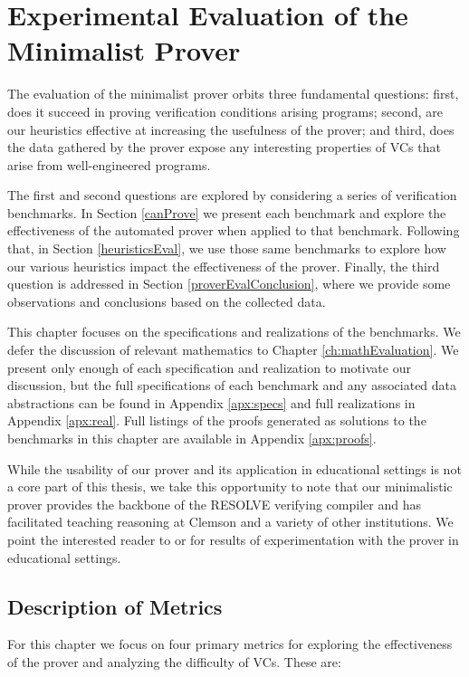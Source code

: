 


\chapter{Experimental Evaluation of the Minimalist Prover\label{ch:proverEvaluation}}
The evaluation of the minimalist prover orbits three fundamental questions: first, does it succeed in proving verification conditions arising programs; second, are our heuristics effective at increasing the usefulness of the prover; and third, does the data gathered by the prover expose any interesting properties of VCs that arise from well-engineered programs.

The first and second questions are explored by considering a series of verification benchmarks.  In Section \ref{canProve} we present each benchmark and explore the effectiveness of the automated prover when applied to that benchmark.  Following that, in Section \ref{heuristicsEval}, we use those same benchmarks to explore how our various heuristics impact the effectiveness of the prover.  Finally, the third question is addressed in Section \ref{proverEvalConclusion}, where we provide some observations and conclusions based on the collected data.

This chapter focuses on the specifications and realizations of the benchmarks.  We defer the discussion of relevant mathematics to Chapter \ref{ch:mathEvaluation}.  We present only enough of each specification and realization to motivate our discussion, but the full specifications of each benchmark and any associated data abstractions can be found in Appendix \ref{apx:specs} and full realizations in Appendix \ref{apx:real}.  Full listings of the proofs generated as solutions to the benchmarks in this chapter are available in Appendix \ref{apx:proofs}.

While the usability of our prover and its application in educational settings is not a core part of this thesis, we take this opportunity to note that our minimalistic prover provides the backbone of the RESOLVE verifying compiler and has facilitated teaching reasoning at Clemson and a variety of other institutions.  We point the interested reader to \cite{cook2012specification} or \cite{sitaraman2009engaging} for results of experimentation with the prover in educational settings.


\section{Description of Metrics}
For this chapter we focus on four primary metrics for exploring the effectiveness of the prover and analyzing the difficulty of VCs.  These are:

